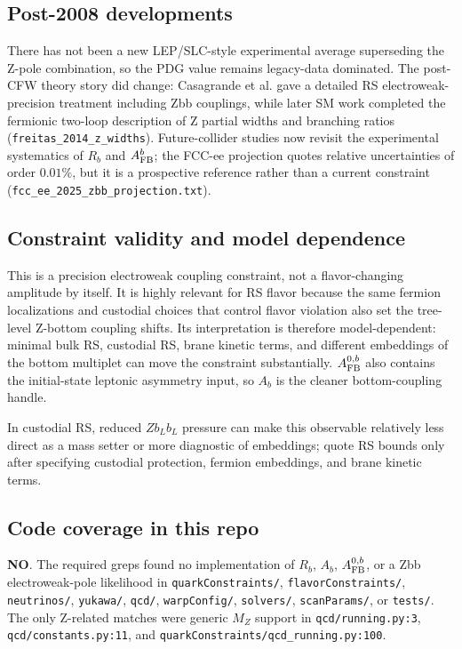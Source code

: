 \subsection*{Post-2008 developments}
There has not been a new LEP/SLC-style experimental average superseding the
Z-pole combination, so the PDG value remains legacy-data dominated.  The
post-CFW theory story did change: Casagrande et al. gave a detailed RS
electroweak-precision treatment including Zbb couplings, while later SM work
completed the fermionic two-loop description of Z partial widths and branching
ratios (\texttt{freitas\_2014\_z\_widths}).  Future-collider studies now
revisit the experimental systematics of \(R_b\) and \(A_{\rm FB}^b\); the
FCC-ee projection quotes relative uncertainties of order \(0.01\%\), but it is
a prospective reference rather than a current constraint
(\texttt{fcc\_ee\_2025\_zbb\_projection.txt}).

\subsection*{Constraint validity and model dependence}
This is a precision electroweak coupling constraint, not a flavor-changing
amplitude by itself.  It is highly relevant for RS flavor because the same
fermion localizations and custodial choices that control flavor violation also
set the tree-level Z-bottom coupling shifts.  Its interpretation is therefore
model-dependent: minimal bulk RS, custodial RS, brane kinetic terms, and
different embeddings of the bottom multiplet can move the constraint
substantially.  \(A_{\rm FB}^{0,b}\) also contains the initial-state leptonic
asymmetry input, so \(A_b\) is the cleaner bottom-coupling handle.

In custodial RS, reduced \(Z b_L b_L\) pressure can make this observable
relatively less direct as a mass setter or more diagnostic of embeddings;
quote RS bounds only after specifying custodial protection, fermion embeddings,
and brane kinetic terms.

\subsection*{Code coverage in this repo}
\textbf{NO}.  The required greps found no implementation of \(R_b\), \(A_b\),
\(A_{\rm FB}^{0,b}\), or a Zbb electroweak-pole likelihood in
\texttt{quarkConstraints/}, \texttt{flavorConstraints/}, \texttt{neutrinos/},
\texttt{yukawa/}, \texttt{qcd/}, \texttt{warpConfig/}, \texttt{solvers/},
\texttt{scanParams/}, or \texttt{tests/}.  The only Z-related matches were
generic \(M_Z\) support in \texttt{qcd/running.py:3},
\texttt{qcd/constants.py:11}, and \texttt{quarkConstraints/qcd\_running.py:100}.

